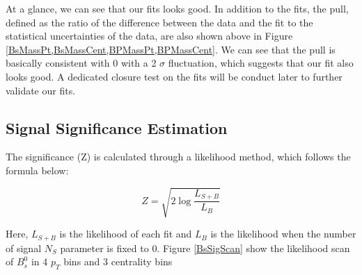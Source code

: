 At a glance, we can see that our fits looks good. In addition to the fits, the pull, defined as the ratio of the difference between the data and the fit to the statistical uncertainties of the data, are also shown above in Figure \ref{BsMassPt,BsMassCent,BPMassPt,BPMassCent}. We can see that the pull is basically consistent with 0 with a 2 $\sigma$ fluctuation, which suggests that our fit also looks good. A dedicated closure test on the fits will be conduct later to further validate our fits.

\subsection{Signal Significance Estimation}

The significance (Z) is calculated through a likelihood method, which follows the formula below:

\begin{equation}
Z=\sqrt{ 2 \log \frac{L_{S+B}}{L_B}}
\end{equation}

Here, $L_{S+B}$ is the likelihood of each fit and $L_B$ is the likelihood when the number of signal $N_S$ parameter is fixed to 0. Figure \ref{BsSigScan} show the likelihood scan of $B^0_s$ in 4 $p_T$ bins and 3 centrality bins

